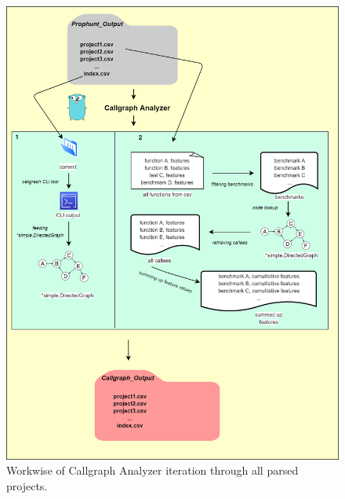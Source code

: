 \documentclass{seal_thesis}
\begin{document}
\begin{figure}[H]
	\centering
	\includegraphics[width=\linewidth]{callgraph}
	\caption{Workwise of Callgraph Analyzer iteration through all parsed projects.}
	\label{fig:callgraph}
\end{figure}
 
\end{document}
